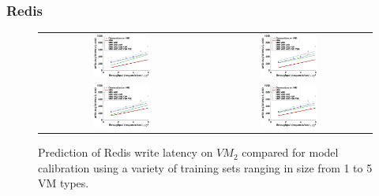 \documentclass{beamer}
\begin{document}
\begin{frame}
\frametitle{Redis}
\begin{figure}
\begin{tabular}{cc}
 \includegraphics[width=0.35\textwidth]{fit_write_avg_latency_r3_2x_m3_2x_r3_x_r3__m3__m3_x.eps} &
\includegraphics[width=0.35\textwidth]{fit_write_avg_latency_r3_2x_r3_x_m3_2x_m3__r3__m3_x.eps} \\
\includegraphics[width=0.35\textwidth]{fit_write_avg_latency_r3_x_m3_2x_r3_2x_r3__m3__m3_x.eps} &
\includegraphics[width=0.35\textwidth]{fit_write_avg_latency_r3_x_r3_2x_m3_2x_r3__m3__m3_x.eps} \\ 
\end{tabular}
\caption{Prediction of Redis write latency on $VM_2$ compared for model calibration using a variety of training sets ranging in size from 1 to 5 VM types.}
\end{figure}
\end{frame}
\end{document}
